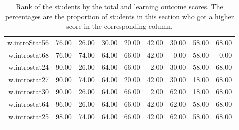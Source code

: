 \documentclass[12pt,english,nohyper]{tufte-handout}\usepackage[]{graphicx}\usepackage[]{color}
\begin{document}
\begin{longtable}{rrrrrrrrr}
  w.introStat56 & 76.00 & 26.00 & 30.00 & 20.00 & 42.00 & 30.00 & 58.00 & 68.00 \\ 
  w.introstat68 & 76.00 & 74.00 & 64.00 & 66.00 & 42.00 & 0.00 & 58.00 & 0.00 \\ 
  w.introstat24 & 90.00 & 26.00 & 64.00 & 66.00 & 2.00 & 30.00 & 58.00 & 68.00 \\ 
  w.introstat27 & 90.00 & 74.00 & 64.00 & 20.00 & 42.00 & 30.00 & 18.00 & 68.00 \\ 
  w.introstat30 & 90.00 & 26.00 & 64.00 & 66.00 & 2.00 & 62.00 & 18.00 & 68.00 \\ 
  w.introstat64 & 96.00 & 26.00 & 64.00 & 66.00 & 42.00 & 62.00 & 58.00 & 68.00 \\ 
  w.introstat25 & 98.00 & 74.00 & 64.00 & 66.00 & 42.00 & 62.00 & 58.00 & 68.00 \\ 
   \hline
\hline
\caption{Rank of the students by the total and learning outcome scores. The percentages are the proportion of students in this section who got a higher score in the corresponding column.} 
\label{tab:LearningObj_rank}
\end{longtable}
\end{document}

